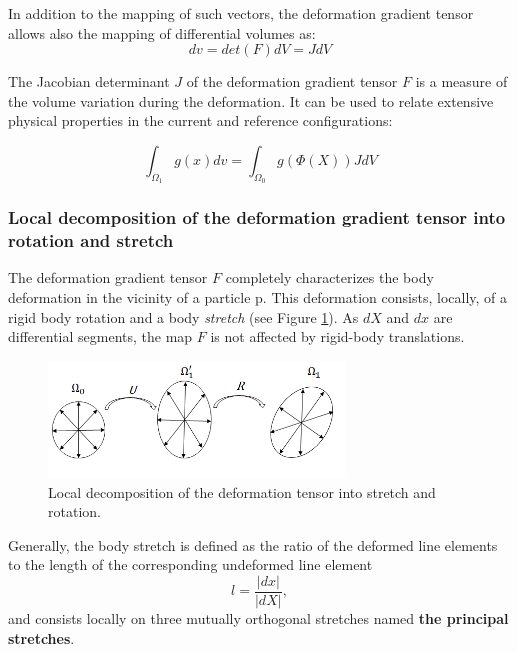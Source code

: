 In addition to the mapping of such vectors, the deformation gradient tensor allows also the mapping of differential volumes as:
\begin{equation}
dv = det(F)dV = JdV
\label{JacobianRelation}
\end{equation}

The Jacobian determinant $J$ of the deformation gradient tensor $F$ is a measure of the volume variation during the deformation. It can be used to relate extensive physical properties in the current and reference configurations:

\begin{equation}
\int_{\Omega_1}g(x)dv = \int_{\Omega_0}g(\Phi(X))JdV
\end{equation}

\subsubsection*{Local decomposition of the deformation gradient tensor into rotation and stretch}\label{deformationgradienttensor}
The deformation gradient tensor $F$ completely characterizes
the body deformation in the vicinity of a particle p. This deformation consists, locally, of a rigid body rotation and a body \textit{stretch} (see Figure \ref{deformationGradientDecom}). As $dX$ and $dx$ are differential segments, the map $F$ is not affected by rigid-body translations.  

\begin{figure}
\centering
\includegraphics[width=0.7\textwidth,keepaspectratio]{figures/deformationTensorDecomposition.png} 
\caption[]{Local decomposition of the deformation tensor into stretch and rotation.  }
\label{deformationGradientDecom}
\end{figure}

Generally, the body stretch is defined as the ratio of the deformed line elements to the length of the corresponding undeformed line element 
\begin{equation}
l = \frac{\vert dx \vert}{\vert dX \vert},
\end{equation} 
and consists locally on three mutually orthogonal stretches named \textbf{the principal stretches}.

